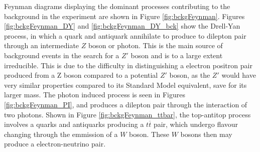 \documentclass{article}
\begin{document}
Feynman diagrams displaying the dominant processes contributing to the background in the experiment are shown in Figure \ref{fig:bckgFeynman}. Figures \ref{fig:bckgFeynman_DY} and \ref{fig:bckgFeynman_DY_bck} show the Drell-Yan process, in which a quark and antiquark annihilate to produce to dilepton pair through an intermediate $Z$ boson or photon. This is the main source of background events in the search for a $Z'$ boson and is to a large extent irreducible. This is due to the difficulty in distinguishing a electron positron pair produced from a Z boson compared to a potential $Z'$ boson, as the $Z'$ would have very similar properties compared to its Standard Model equivalent, save for its larger mass. The photon induced process is seen in Figures \ref{fig:bckgFeynman_PI}, and produces a dilepton pair through the interaction of two photons. Shown in Figure \ref{fig:bckgFeynman_ttbar}, the top-antitop process involves a quarks and antiquarks producing a $t\overline{t}$ pair, which undergo flavour changing through the emmission of a $W$ boson. These $W$ bosons then may produce a electron-neutrino pair.
\end{document}
